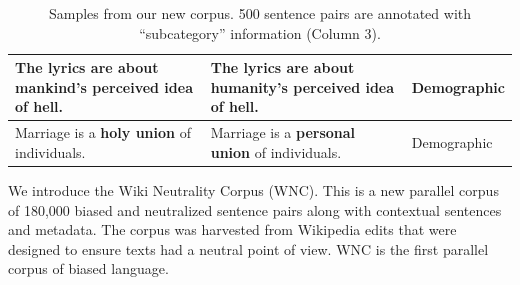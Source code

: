 \begin{table}[ht]
\begin{tabular}{lll}
The lyrics are about \textbf{mankind}'s perceived idea of hell. & The lyrics are about \textbf{humanity}'s perceived idea of hell. & Demographic \\ \hline
Marriage is a \textbf{holy union} of individuals. & Marriage is a \textbf{personal union} of individuals. & Demographic \\ \hline
\end{tabular}
\vspace*{-4pt}
\caption{Samples from our new corpus. 500 sentence pairs are annotated with ``subcategory'' information (Column 3).}
\label{tab:samples}
\end{table}

We introduce the Wiki Neutrality Corpus (WNC). This is a new parallel corpus of 180,000 biased and neutralized sentence pairs along with contextual sentences and metadata. The corpus was harvested from Wikipedia edits that were designed to ensure texts had a neutral point of view.  WNC is the first parallel corpus of biased language. %

